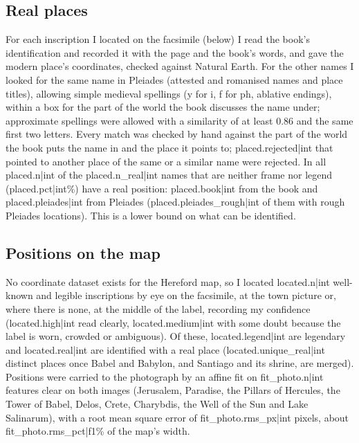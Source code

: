 \documentclass[11pt,a4paper]{article}
\begin{document}
\subsection{Real places}
For each inscription I located on the facsimile (below) I read the book's identification and recorded it with the page and the book's words, and gave the modern place's coordinates, checked against Natural Earth. For the other names I looked for the same name in Pleiades (attested and romanised names and place titles), allowing simple medieval spellings (y for i, f for ph, ablative endings), within a box for the part of the world the book discusses the name under; approximate spellings were allowed with a similarity of at least 0.86 and the same first two letters. Every match was checked by hand against the part of the world the book puts the name in and the place it points to; {{placed.rejected|int}} that pointed to another place of the same or a similar name were rejected. In all {{placed.n|int}} of the {{placed.n_real|int}} names that are neither frame nor legend ({{placed.pct|int}}\%) have a real position: {{placed.book|int}} from the book and {{placed.pleiades|int}} from Pleiades ({{placed.pleiades_rough|int}} of them with rough Pleiades locations). This is a lower bound on what can be identified.

\subsection{Positions on the map}
No coordinate dataset exists for the Hereford map, so I located {{located.n|int}} well-known and legible inscriptions by eye on the facsimile, at the town picture or, where there is none, at the middle of the label, recording my confidence ({{located.high|int}} read clearly, {{located.medium|int}} with some doubt because the label is worn, crowded or ambiguous). Of these, {{located.legend|int}} are legendary and {{located.real|int}} are identified with a real place ({{located.unique_real|int}} distinct places once Babel and Babylon, and Santiago and its shrine, are merged). Positions were carried to the photograph by an affine fit on {{fit_photo.n|int}} features clear on both images (Jerusalem, Paradise, the Pillars of Hercules, the Tower of Babel, Delos, Crete, Charybdis, the Well of the Sun and Lake Salinarum), with a root mean square error of {{fit_photo.rms_px|int}} pixels, about {{fit_photo.rms_pct|f1}}\% of the map's width.
\end{document}

